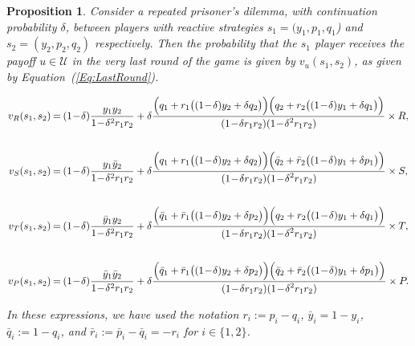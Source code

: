 \documentclass[11pt]{article}
\theoremstyle{plainCl1}
\newtheorem{Prop}{Proposition}
\theoremstyle{plainCl2}
\begin{document}
\begin{Prop}\label{proposition:last_round}
    Consider a repeated prisoner's dilemma, with
    continuation probability $\delta$, between players with reactive strategies
    $s_1\!=\!(y_1, p_1, q_1$)  and $s_2\!=\!(y_2,p_2,q_2)$ respectively. Then the
    probability that the $s_1$ player receives the payoff $u\!\in\! \mathcal{U}$ in
    the very last round of the game is given by $v_{u}(s_1,s_2)$, as given by
    Equation~(\ref{Eq:LastRound}).

    \begin{equation} \label{Eq:LastRound}
      \setlength{\arraycolsep}{1pt}
      \begin{array}{rcl}
    
      v_{R}(s_1,s_2) &= &\displaystyle (1\!-\!\delta)\frac{y_1y_2}{1\!-\!\delta^2 r_1 r_2}+\delta \frac{\Big(q_1+r_1\big((1\!-\!\delta)y_2+\delta q_2\big)\Big) \Big(q_2+r_2\big((1\!-\!\delta)y_1+\delta q_1\big)\Big)}
      {\displaystyle(1\!-\!\delta r_1r_2)(1\!-\!\delta^2 r_1 r_2)} \times R,\\[1cm]
    
      v_{S}(s_1,s_2) &= &\displaystyle (1\!-\!\delta)\frac{y_1\bar{y}_2}{1\!-\!\delta^2 r_1 r_2}+\delta \frac{\Big(q_1+r_1\big((1\!-\!\delta)y_2+\delta q_2\big)\Big) \Big(\bar{q}_2+\bar{r}_2\big((1\!-\!\delta)y_1+\delta p_1\big)\Big)}
      {\displaystyle(1\!-\!\delta r_1r_2)(1\!-\!\delta^2 r_1 r_2)} \times S,\\[1cm]
    
      v_{T}(s_1,s_2) &= &\displaystyle (1\!-\!\delta)\frac{\bar{y}_1y_2}{1\!-\!\delta^2 r_1 r_2}+\delta \frac{\Big(\bar{q}_1+\bar{r}_1\big((1\!-\!\delta)y_2+\delta p_2\big)\Big) \Big(q_2+r_2\big((1\!-\!\delta)y_1+\delta q_1\big)\Big)}
      {\displaystyle(1\!-\!\delta r_1r_2)(1\!-\!\delta^2 r_1 r_2)} \times T,\\[1cm]
    
      v_{P}(s_1,s_2) &= &\displaystyle (1\!-\!\delta)\frac{\bar{y}_1\bar{y}_2}{1\!-\!\delta^2 r_1 r_2}+\delta \frac{\Big(\bar{q}_1+\bar{r}_1\big((1\!-\!\delta)y_2+\delta p_2\big)\Big) \Big(\bar{q}_2+\bar{r}_2\big((1\!-\!\delta)y_1+\delta p_1\big)\Big)}
      {\displaystyle(1\!-\!\delta r_1r_2)(1\!-\!\delta^2 r_1 r_2)} \times P.
      \end{array}
    \end{equation}

In these expressions, we have used the notation $r_i:=p_i\!-\!q_i$,
$\bar{y}_i\!=\!1\!-\!y_i$, $\bar{q}_i:=1\!-\!q_i$, and
$\bar{r}_i:=\bar{p}_i\!-\!\bar{q}_i=-r_i$ for $i\!\in\!\{1,2\}$.
\end{Prop}
\end{document}

